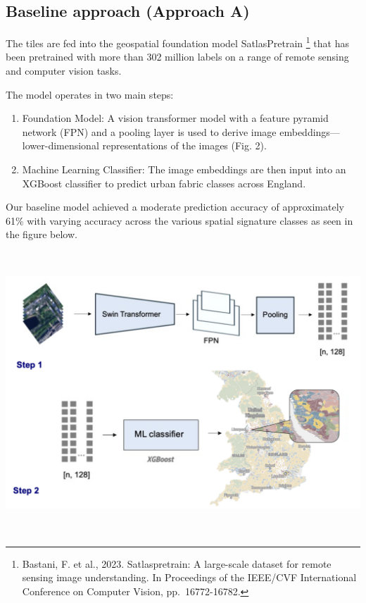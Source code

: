 \documentclass[
  letterpaper,
  DIV=11,
  numbers=noendperiod]{scrartcl}
\providecommand{\tightlist}{%
  \setlength{\itemsep}{0pt}\setlength{\parskip}{0pt}}\usepackage{longtable,booktabs,array}
\begin{document}
\subsection{Baseline approach (Approach
A)}\label{baseline-approach-approach-a}

The tiles are fed into the geospatial foundation model SatlasPretrain
\footnote{Bastani, F. et al., 2023. Satlaspretrain: A large-scale
  dataset for remote sensing image understanding. In Proceedings of the
  IEEE/CVF International Conference on Computer Vision, pp.~16772-16782.}
that has been pretrained with more than 302 million labels on a range of
remote sensing and computer vision tasks.

The model operates in two main steps:

\begin{enumerate}
\def\labelenumi{\arabic{enumi}.}
\tightlist
\item
  Foundation Model: A vision transformer model with a feature pyramid
  network (FPN) and a pooling layer is used to derive image
  embeddings---lower-dimensional representations of the images (Fig. 2).
\item
  Machine Learning Classifier: The image embeddings are then input into
  an XGBoost classifier to predict urban fabric classes across England.
\end{enumerate}

Our baseline model achieved a moderate prediction accuracy of
approximately 61\% with varying accuracy across the various spatial
signature classes as seen in the figure below.

\begin{center}
\includegraphics[width=\textwidth,height=4.16667in]{../figures/algo_design/baseline.png}
\end{center}
\end{document}
